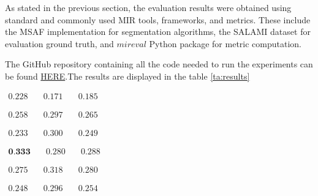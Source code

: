 
As stated in the previous section, the evaluation results were obtained using standard and commonly used MIR tools, frameworks, and metrics. These include the MSAF \cite{MSAF} implementation for segmentation algorithms, the SALAMI dataset \cite{Smith2011DESIGNANNOTATIONS} for evaluation ground truth, and $mireval$ Python package \cite{RaffelMir_eval:METRICS} for metric computation.

The GitHub repository containing all the code needed to run the experiments can be found \href{https://github.com/oriolcolomefont/Master-Thesis.git}{HERE}.The results are displayed in the table \ref{ta:results}


\newsavebox\embeddioaSF
\begin{lrbox}{\embeddioaSF}
   $\begin{aligned}
     0.228 & \quad 0.171 & \quad 0.185
    \end{aligned} $
\end{lrbox}

\newsavebox\embeddioaFoote
\begin{lrbox}{\embeddioaFoote}
   $\begin{aligned}
    0.258  & \quad 0.297 & \quad 0.265
    \end{aligned} $
\end{lrbox}

\newsavebox\embeddioaCNMF
\begin{lrbox}{\embeddioaCNMF}
   $\begin{aligned}
    0.233  & \quad 0.300  & \quad 0.249
    \end{aligned} $
\end{lrbox}

\newsavebox\embeddiobSF
\begin{lrbox}{\embeddiobSF}
   $\begin{aligned}
     \textbf{0.333} & \quad 0.280 & \quad 0.288
    \end{aligned} $
\end{lrbox}

\newsavebox\embeddiobFoote
\begin{lrbox}{\embeddiobFoote}
   $\begin{aligned}
     0.275 & \quad 0.318 & \quad 0.280
    \end{aligned} $
\end{lrbox}

\newsavebox\embeddiobCNMF
\begin{lrbox}{\embeddiobCNMF}
   $\begin{aligned}
     0.248 & \quad 0.296 & \quad 0.254
    \end{aligned} $
\end{lrbox}

